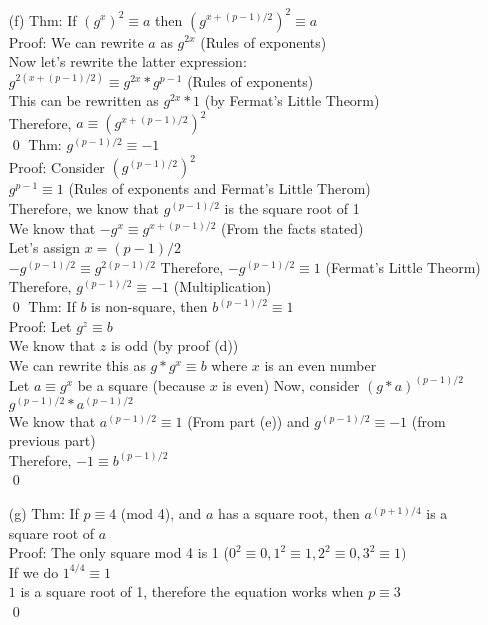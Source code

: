 \documentclass[11pt]{article}
\theoremstyle{definition}
\begin{document}
\begin{enumerate}
	\item[(f)]
	Thm: If $(g^x)^2 \equiv a$ then $(g^{x + (p-1)/2})^2 \equiv a$\\
	\newline
	Proof: We can rewrite $a$ as $g^{2x}$ (Rules of exponents)\\
	Now let's rewrite the latter expression:\\
	$g^{2(x + (p-1)/2)} \equiv g^{2x} * g^{p-1}$ (Rules of exponents)\\
	This can be rewritten as $g^{2x} * 1$ (by Fermat's Little Theorm)\\
	Therefore, $a \equiv (g^{x + (p-1)/2})^2$\\
	\qed
	\newline
	Thm: $g^{(p-1)/2} \equiv -1$\\
	\newline
	Proof: Consider $(g^{(p-1)/2})^2$\\
	$g^{p-1} \equiv 1$  (Rules of exponents and Fermat's Little Therom)\\
	Therefore, we know that $g^{(p-1)/2}$ is the square root of 1\\
	We know that $-g^x \equiv g^{x + (p-1)/2}$ (From the facts stated)\\
	Let's assign $x = (p-1)/2$\\
	$-g^{(p-1)/2} \equiv g^{2(p-1)/2}$
	Therefore, $-g^{(p-1)/2} \equiv 1$ (Fermat's Little Theorm)\\
	Therefore, $g^{(p-1)/2} \equiv -1$ (Multiplication)\\
	\qed
	\newline
	Thm: If $b$ is non-square, then $b^{(p-1)/2} \equiv 1$\\
	\newline
	Proof: Let $g^z \equiv b$\\
	We know that $z$ is odd (by proof (d))\\
	We can rewrite this as $g * g^x \equiv b$ where $x$ is an even number\\
	Let $a \equiv g^x$ be a square (because $x$ is even)
	Now, consider $(g*a)^{(p-1)/2}$\\
	$g^{(p-1)/2} * a^{(p-1)/2}$\\
	We know that $a^{(p-1)/2} \equiv 1$ (From part (e)) and $g^{(p-1)/2} \equiv -1$ (from previous part)\\
	Therefore, $-1 \equiv b^{(p-1)/2}$\\
	\qed

	\item[(g)]
	Thm: If $p \equiv 4$ (mod 4), and $a$ has a square root, then $a^{(p+1)/4}$ is a square root of $a$\\
	\newline
	Proof: The only square mod 4 is 1 ($0^2 \equiv 0, 1^2 \equiv 1, 2^2 \equiv 0, 3^2 \equiv 1)$\\
	If we do $1^{4/4} \equiv 1$\\
	$1$ is a square root of 1, therefore the equation works when $p \equiv 3$\\
	\qed

\end{enumerate}
\end{document}
